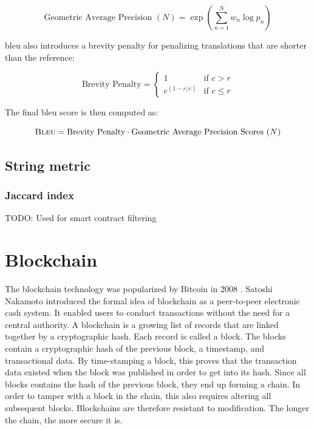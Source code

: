 \begin{equation}
    \label{eq:geometric-average-precision}
    \text{Geometric Average Precision $\left(N\right)$} = \exp \left( \sum_{n=1}^{N} w_n \log{p_n} \right)
\end{equation}

\noindent \acrshort{bleu} also introduces a brevity penalty for penalizing translations that are shorter than the reference:

\begin{equation}
    \label{eqn:brevity-penalty}
    \text{Brevity Penalty} = 
    \begin{cases}
        1 & \text{if } c > r\\
        e^{\left(1-r/c \right)} & \text{if } c \le r
    \end{cases}
\end{equation}

\noindent The final \acrshort{bleu} score is then computed as:

\begin{equation}
    \label{eqn:bleu}
    \textsc{Bleu} = \text{Brevity Penalty} \cdot \text{Geometric Average Precision Scores $\left(N\right)$}
\end{equation}

\subsection{String metric}
\label{sec:string-metric}

\subsubsection{Jaccard index}
\label{sec:jaccard-index}
TODO: Used for smart contract filtering

\section{Blockchain}
\label{sec:blockchain}
The blockchain technology was popularized by Bitcoin in 2008 . Satoshi Nakamoto introduced the formal idea of blockchain as a peer-to-peer electronic cash system. It enabled users to conduct transactions without the need for a central authority. A blockchain is a growing list of records that are linked together by a cryptographic hash. Each record is called a block. The blocks contain a cryptographic hash of the previous block, a timestamp, and transactional data. By time-stamping a block, this proves that the transaction data existed when the block was published in order to get into its hash. Since all blocks contains the hash of the previous block, they end up forming a chain. In order to tamper with a block in the chain, this also requires altering all subsequent blocks. Blockchains are therefore resistant to modification. The longer the chain, the more secure it is.

